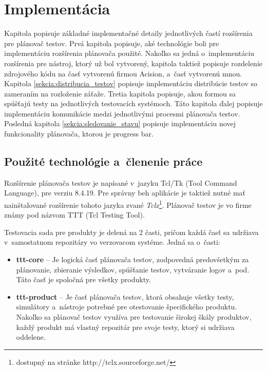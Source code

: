 \chapter{Implementácia}
\label{kapitola:implementacia}
Kapitola popisuje základné implementačné detaily jednotlivých častí 
rozšírenia pre plánovač testov. Prvá kapitola popisuje, aké 
technológie boli pre implementáciu rozšírenia plánovača použité.
Nakoľko sa jedná o~implementáciu rozšírenia pre nástroj, ktorý už bol 
vytvorený, kapitola taktiež popisuje rozdelenie zdrojového kódu na časť 
vytvorenú firmou Acision, a~časť vytvorenú mnou.
Kapitola \ref{sekcia:distribucia_testov} popisuje implementáciu 
distribúcie testov so zameraním na rozloženie záťaže. 
Tretia kapitola popisuje, akou formou sa spúšťajú testy na jednotlivých 
testovacích systémoch. Táto kapitola ďalej popisuje implementáciu 
komunikácie medzi jednotlivými procesmi plánovača testov.
Posledná kapitola \ref{sekcia:sledovanie_stavu} popisuje implementáciu 
novej funkcionality plánovača, ktorou je progress bar.

\section{Použité technológie a~členenie práce}
\label{sekcia:pouzite_technologie}
Rozšírenie plánovača testov je napísané v~jazyku Tcl/Tk 
(Tool Command Language), pre verziu 8.4.19.
Pre správny beh aplikácie je taktiež nutné mať nainštalované rozšírenie 
tohoto jazyka zvané 
\textit{Tclx}\footnote{dostupný na stránke http://tclx.sourceforge.net/}.
Plánovač testov je vo firme známy pod názvom TTT (Tcl Testing Tool).

Testovacia sada pre produkty je delená na 2 časti, 
pričom každá časť sa udržiava v~samostatnom repozitáry vo verzovacom 
systéme. Jedná sa o~časti: 
\begin{itemize}
\item \textbf{ttt-core} -- Je logická časť plánovača testov, zodpovedná 
predovšetkým za plánovanie, zbieranie výsledkov,
spúšťanie testov, vytváranie logov a~pod. 
Táto časť je spoločná pre všetky produkty. 
\item \textbf{ttt-product} -- Je časť plánovača testov, ktorá obsahuje 
všetky testy, simulátory a~nástroje potrebné pre otestovanie 
špecifického produktu. Nakoľko sa plánovač testov využíva pre testovanie 
širokej škály produktov, každý produkt má vlastný repozitár pre svoje 
testy, ktorý si udržiava oddelene.
\end{itemize} 

